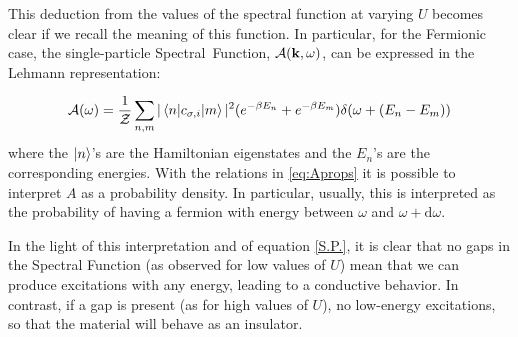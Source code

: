 This deduction from the values of the spectral function at varying $U$ becomes clear if we recall the meaning of this function.  
In particular, for the Fermionic case, the single-particle Spectral~Function, $\mathcal{A(\bold{k},\omega)}$, can be expressed in the Lehmann representation: 

\begin{equation}\label{S.P.}
  \mathcal{A}(\omega) = \frac{1}{\mathcal{Z}}\sum_{n,m}|\braket{n|c_{\bold{\sigma},i}|m}|^2 (e^{-\beta E_n} + e^{-\beta E_m})\delta(\omega+(E_n-E_m))
\end{equation}
where the $\ket{n}$'s are the Hamiltonian eigenstates and the $E_n$'s are the corresponding energies. 
With the relations in \eqref{eq:Aprops} it is possible to interpret $A$ as a probability density. In particular, usually, this is interpreted as the probability of having a fermion with energy between $\omega$ and $\omega + \mathrm{d}\omega$.

In the light of this interpretation and of equation \eqref{S.P.}, it is clear that no gaps in the Spectral Function (as observed for low values of $U$) mean that we can produce excitations with any energy, leading to a conductive behavior. In contrast, if a gap is present (as for high values of $U$), no low-energy excitations, so that the material will behave as an insulator.


\clearpage
